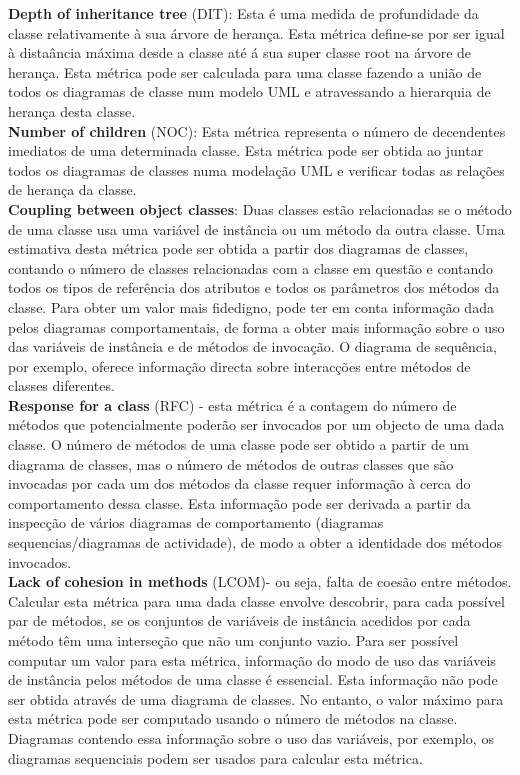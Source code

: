 \documentclass[11pt,a4paper,notitlepage]{article}
\begin{document}
\textbf{Depth of inheritance tree} (DIT):
Esta é uma medida de profundidade da classe relativamente à sua árvore de herança. Esta métrica define-se por ser igual à distaância máxima
desde a classe até á sua super classe root na árvore de herança. Esta métrica pode ser calculada para uma classe fazendo a união de todos os diagramas
de classe num modelo UML e atravessando a hierarquia de herança desta classe.\\

\textbf{Number of children} (NOC): Esta métrica representa o número de decendentes imediatos de uma determinada classe. Esta métrica pode ser obtida ao juntar todos os diagramas de classes numa modelação UML e verificar todas as relações de herança da classe.\\

\textbf{Coupling between object classes}: Duas classes estão relacionadas se o método de uma classe usa uma variável de instância ou um método da outra classe. Uma estimativa desta métrica pode ser obtida a partir dos diagramas de classes, contando o número de classes relacionadas com a classe em questão e contando todos os tipos de referência dos atributos e todos os parâmetros dos métodos da classe. Para obter um valor mais fidedigno, pode ter em conta informação dada pelos diagramas comportamentais, de forma a obter mais informação sobre o uso das variáveis de instância e de métodos de invocação. O diagrama de sequência, por exemplo, oferece informação directa sobre interacções entre métodos de classes diferentes. \\

\textbf{Response for a class} (RFC) - esta métrica é a contagem do número de métodos que potencialmente poderão ser invocados por um objecto de uma dada classe. O número de métodos de uma classe pode ser obtido a partir de um diagrama de classes, mas o número de métodos de outras classes que são invocadas por cada um dos métodos da classe requer informação à cerca do comportamento dessa classe. Esta informação pode ser derivada a partir da inspecção de vários diagramas de comportamento (diagramas sequencias/diagramas de actividade), de modo a obter a identidade dos métodos invocados.\\


\textbf{Lack of cohesion in methods} (LCOM)- ou seja, falta de coesão entre métodos. Calcular esta métrica para uma dada classe envolve descobrir, para cada possível par de métodos, se os conjuntos de variáveis de instância acedidos por cada método têm uma interseção que não um conjunto vazio.
Para ser possível computar um valor para esta métrica, informação do modo de uso das variáveis de instância pelos métodos de uma classe é essencial. Esta informação não pode ser obtida através de uma diagrama de classes. No entanto, o valor máximo para esta métrica pode ser computado usando o número de métodos na classe. Diagramas contendo essa informação sobre o uso das variáveis, por exemplo, os diagramas sequenciais podem ser usados para calcular esta métrica.\\
\end{document}
